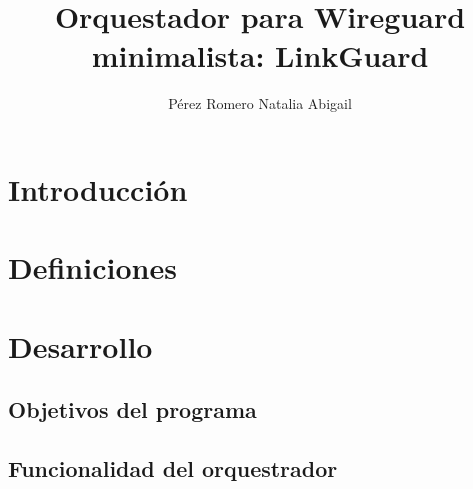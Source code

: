 \documentclass[letterpaper,12pt,oneside]{book}
\author{Pérez Romero Natalia Abigail}
\title{Orquestador para Wireguard minimalista: LinkGuard}
\begin{document}
\frontmatter
\maketitle


\mainmatter

\tableofcontents

\chapter{Introducción} %



\chapter{Definiciones}


\chapter{Desarrollo}


\section{Objetivos del programa}


\section{Funcionalidad del orquestrador}

\end{document}
